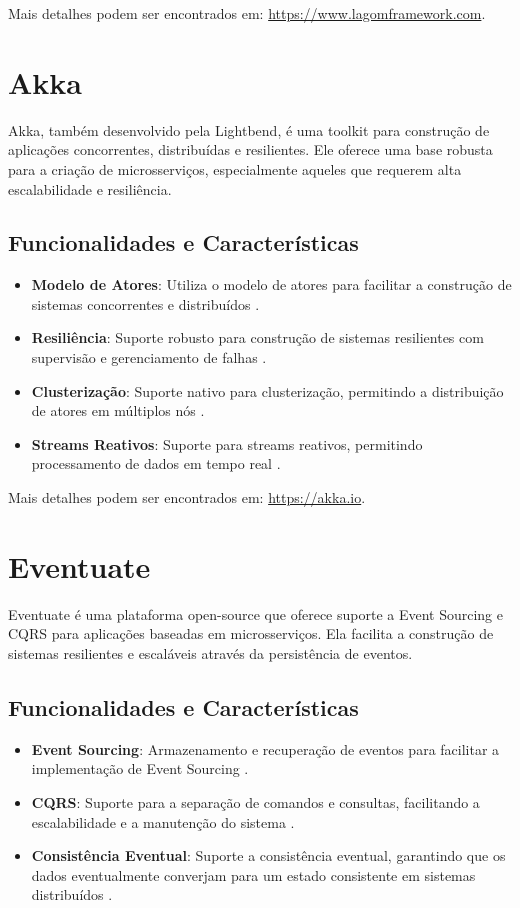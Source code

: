 Mais detalhes podem ser encontrados em: \url{https://www.lagomframework.com}.


\section{Akka}
Akka, também desenvolvido pela Lightbend, é uma toolkit para construção de aplicações concorrentes, distribuídas e resilientes. Ele oferece uma base robusta para a criação de microsserviços, especialmente aqueles que requerem alta escalabilidade e resiliência.

\subsection{Funcionalidades e Características}
\begin{itemize}
    \item \textbf{Modelo de Atores}: Utiliza o modelo de atores para facilitar a construção de sistemas concorrentes e distribuídos \cite{Akka2021}.
    \item \textbf{Resiliência}: Suporte robusto para construção de sistemas resilientes com supervisão e gerenciamento de falhas \cite{Akka2021}.
    \item \textbf{Clusterização}: Suporte nativo para clusterização, permitindo a distribuição de atores em múltiplos nós \cite{Akka2021}.
    \item \textbf{Streams Reativos}: Suporte para streams reativos, permitindo processamento de dados em tempo real \cite{Akka2021}.
\end{itemize}

Mais detalhes podem ser encontrados em: \url{https://akka.io}.


\section{Eventuate}
Eventuate é uma plataforma open-source que oferece suporte a Event Sourcing e CQRS para aplicações baseadas em microsserviços. Ela facilita a construção de sistemas resilientes e escaláveis através da persistência de eventos.

\subsection{Funcionalidades e Características}
\begin{itemize}
    \item \textbf{Event Sourcing}: Armazenamento e recuperação de eventos para facilitar a implementação de Event Sourcing \cite{Eventuate2021}.
    \item \textbf{CQRS}: Suporte para a separação de comandos e consultas, facilitando a escalabilidade e a manutenção do sistema \cite{richardson2018}.
    \item \textbf{Consistência Eventual}: Suporte a consistência eventual, garantindo que os dados eventualmente converjam para um estado consistente em sistemas distribuídos \cite{helland2015}.
\end{itemize}


